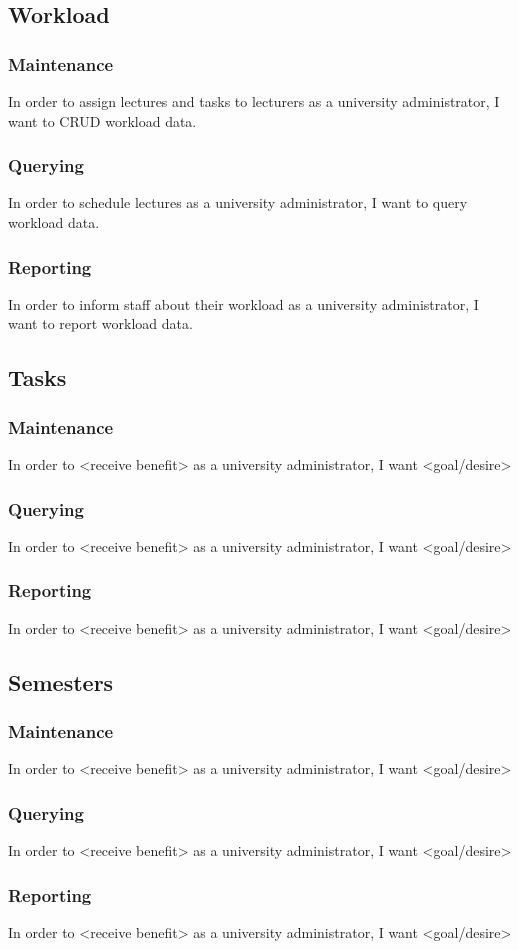 \subsection{Workload}
\subsubsection{Maintenance}
In order to assign lectures and tasks to lecturers as a university administrator,
I want to CRUD workload data.

\subsubsection{Querying}
In order to schedule lectures as a university administrator, I want to query
workload data.

\subsubsection{Reporting}
In order to inform staff about their workload as a university administrator, I
want to report workload data.

\subsection{Tasks}
\subsubsection{Maintenance}
In order to <receive benefit> as a university administrator, I want <goal/desire>
\subsubsection{Querying}
In order to <receive benefit> as a university administrator, I want <goal/desire>
\subsubsection{Reporting}
In order to <receive benefit> as a university administrator, I want <goal/desire>
\subsection{Semesters}
\subsubsection{Maintenance}
In order to <receive benefit> as a university administrator, I want <goal/desire>
\subsubsection{Querying}
In order to <receive benefit> as a university administrator, I want <goal/desire>
\subsubsection{Reporting}
In order to <receive benefit> as a university administrator, I want <goal/desire>
